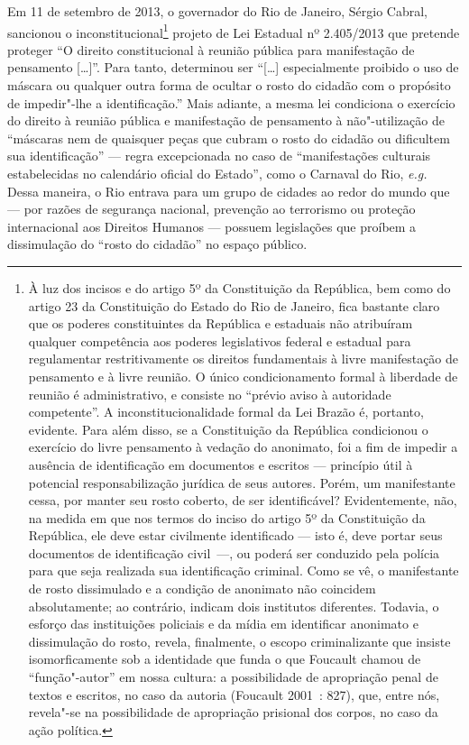 Em 11 de setembro de 2013, o governador do Rio de Janeiro, Sérgio
Cabral, sancionou o inconstitucional\footnote{À luz dos
  incisos  e  do artigo 5º da Constituição da República, bem como
  do artigo 23 da Constituição do Estado do Rio de Janeiro, fica
  bastante claro que os poderes constituintes da República e estaduais
  não atribuíram qualquer competência aos poderes legislativos federal e
  estadual para regulamentar restritivamente os direitos fundamentais à
  livre manifestação de pensamento e à livre reunião. O único
  condicionamento formal à liberdade de reunião é administrativo, e
  consiste no ``prévio aviso à autoridade competente''. A
  inconstitucionalidade formal da Lei Brazão é, portanto, evidente. Para
  além disso, se a Constituição da República condicionou o exercício do
  livre pensamento à vedação do anonimato, foi a fim de impedir a
  ausência de identificação em documentos e escritos --- princípio útil à
  potencial responsabilização jurídica de seus autores. Porém, um
  manifestante cessa, por manter seu rosto coberto, de ser
  identificável? Evidentemente, não, na medida em que nos termos do
  inciso  do artigo 5º da Constituição da República, ele deve estar
  civilmente identificado --- isto é, deve portar seus documentos de
  identificação civil~---, ou poderá ser conduzido pela polícia para que
  seja realizada sua identificação criminal. Como se vê, o manifestante
  de rosto dissimulado e a condição de anonimato não coincidem
  absolutamente; ao contrário, indicam dois institutos diferentes.
  Todavia, o esforço das instituições policiais e da mídia em
  identificar anonimato e dissimulação do rosto, revela, finalmente, o
  escopo criminalizante que insiste isomorficamente sob a identidade que
  funda o que Foucault chamou de ``função"-autor'' em nossa cultura: a
  possibilidade de apropriação penal de textos e escritos, no caso da
  autoria (Foucault 2001~: 827), que, entre nós, revela"-se na
  possibilidade de apropriação prisional dos corpos, no caso da ação
  política.} projeto de Lei Estadual nº 2.405/2013 que pretende
proteger ``O direito constitucional à reunião pública para manifestação
de pensamento {[}\ldots{}{]}''. Para tanto, determinou ser ``{[}\ldots{}{]}
especialmente proibido o uso de máscara ou qualquer outra forma de
ocultar o rosto do cidadão com o propósito de impedir"-lhe a
identificação.'' Mais adiante, a mesma lei condiciona o exercício do
direito à reunião pública e manifestação de pensamento à não"-utilização
de ``máscaras nem de quaisquer peças que cubram o rosto do cidadão ou
dificultem sua identificação'' --- regra excepcionada no caso de
``manifestações culturais estabelecidas no calendário oficial do
Estado'', como o Carnaval do Rio, \emph{e.g.} Dessa maneira, o Rio
entrava para um grupo de cidades ao redor do mundo que --- por razões de
segurança nacional, prevenção ao terrorismo ou proteção internacional
aos Direitos Humanos --- possuem legislações que proíbem a dissimulação
do ``rosto do cidadão'' no espaço público.


